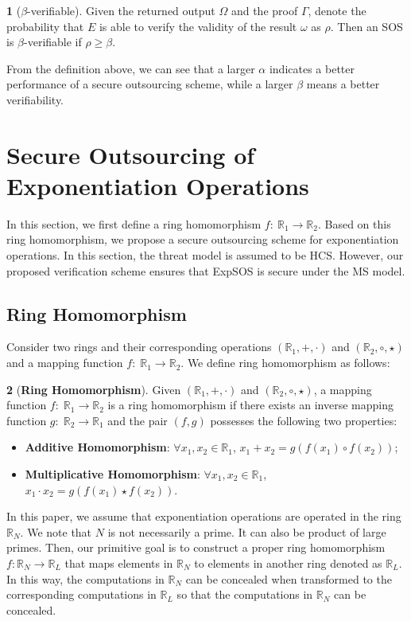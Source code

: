 \documentclass[english,draftcls,onecolumn,11pt]{IEEEtran}
\theoremstyle{definition}
\newtheorem{defn}{\protect\definitionname}
\theoremstyle{plain}
\theoremstyle{plain}
\theoremstyle{definition}
\providecommand{\definitionname}{Definition}
\begin{document}
\begin{defn}[$\beta$-verifiable]
\label{def:checkable} Given the returned output $\Omega$ and the
proof $\Gamma$, denote the probability that $E$ is able to verify
the validity of the result $\omega$ as $\rho$. Then an SOS is $\beta$-verifiable
if $\rho\geq\beta$.
\end{defn}
From the definition above, we can see that a larger $\alpha$ indicates
a better performance of a secure outsourcing scheme, while a larger
$\beta$ means a better verifiability.


\section{Secure Outsourcing of Exponentiation Operations \label{sec:Proposed-Scheme}}

In this section, we first define a ring homomorphism $f:\:\mathbb{R}_{1}\rightarrow\mathbb{R}_{2}$.
Based on this ring homomorphism, we propose a secure outsourcing scheme
for exponentiation operations. In this section, the threat model is
assumed to be HCS.\textcolor{red}{{} }However, our proposed verification
scheme ensures that ExpSOS is secure under the MS model.


\subsection{Ring Homomorphism}

Consider two rings and their corresponding operations $(\mathbb{R}_{1},+,\cdot)$
and $(\mathbb{R}_{2},\circ,\star)$ and a mapping function $f:\;\mathbb{R}_{1}\rightarrow\mathbb{R}_{2}$.
We define ring homomorphism as follows:
\begin{defn}[\textbf{Ring Homomorphism}]
 Given $(\mathbb{R}_{1},+,\cdot)$ and $(\mathbb{R}_{2},\circ,\star)$,
a mapping function $f:\;\mathbb{R}_{1}\rightarrow\mathbb{R}_{2}$
is a ring homomorphism if there exists an inverse mapping function
$g:\;\mathbb{R}_{2}\rightarrow\mathbb{R}_{1}$ and the pair $(f,g)$
possesses the following two properties:\end{defn}
\begin{itemize}
\item \textbf{Additive Homomorphism}: $\forall x_{1},x_{2}\in\mathbb{R}_{1}$,
$x_{1}+x_{2}=g(f(x_{1})\circ f(x_{2}))$;
\item \textbf{Multiplicative Homomorphism}: $\forall x_{1},x_{2}\in\mathbb{R}_{1}$,
$x_{1}\cdot x_{2}=g(f(x_{1})\star f(x_{2}))$.
\end{itemize}
In this paper, we assume that exponentiation operations are operated
in the ring $\mathbb{R}_{N}$. We note that $N$ is not necessarily
a prime. It can also be product of large primes. Then, our primitive
goal is to construct a proper ring homomorphism $f:\mathbb{R}_{N}\to\mathbb{R}_{L}$
that maps elements in $\mathbb{R}_{N}$ to elements in another ring
denoted as $\mathbb{R}_{L}$. In this way, the computations in $\mathbb{R}_{N}$
can be concealed when transformed to the corresponding computations
in $\mathbb{R}_{L}$ so that the computations in $\mathbb{R}_{N}$
can be concealed. 
\end{document}
